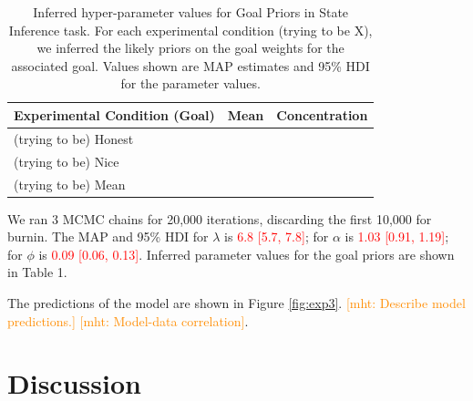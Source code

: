 \documentclass[10pt,letterpaper]{article}
\newcommand{\red}[1]{\textcolor{Red}{#1}}
\newcommand{\mht}[1]{\textcolor{DarkOrange}{[mht: #1]}}
\begin{document}
\begin{table}[]
\centering
\label{my-table}
\begin{tabular}{lll}
\hline
Experimental Condition (Goal) & Mean & Concentration \\ \hline
(trying to be) Honest                        &      &               \\
(trying to be) Nice                          &      &               \\
(trying to be) Mean                          &      &               \\ \hline
\end{tabular}
\caption{Inferred hyper-parameter values for Goal Priors in State Inference task.
For each experimental condition (trying to be X), we inferred the likely priors on the goal weights for the associated goal.
Values shown are MAP estimates and 95\% HDI for the parameter values.}
\end{table}
We ran 3 MCMC chains for 20,000 iterations, discarding the first 10,000 for burnin.
The MAP and 95\% HDI for $\lambda$ is \red{6.8 [5.7, 7.8]}; for $\alpha$ is \red{1.03 [0.91, 1.19]}; for $\phi$ is \red{0.09 [0.06, 0.13]}.
Inferred parameter values for the goal priors are shown in Table 1.

The predictions of the model are shown in Figure \ref{fig:exp3}.
\mht{Describe model predictions.}
\mht{Model-data correlation}. 

\section{Discussion}



\setlength{\bibleftmargin}{.125in}
\setlength{\bibindent}{-\bibleftmargin}


\end{document}
